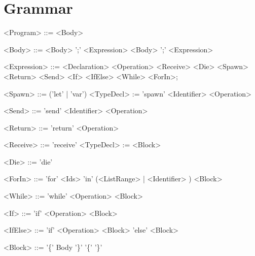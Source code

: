 \section{Grammar}
\setlength{\grammarindent}{100pt}
\begin{grammar}
<Program> ::= <Body>

<Body> ::= <Body> ';' <Expression>
 \alt <Body> ';'
 \alt <Expression>

<Expression> ::= <Declaration>
 \alt <Operation>
 \alt <Receive>
 \alt <Die>
 \alt <Spawn>
 \alt <Return>
 \alt <Send>
 \alt <If>
 \alt <IfElse>
 \alt <While>
 \alt <ForIn>;

<Spawn> ::= ('let' | 'var') <TypeDecl> := 'spawn' <Identifier> <Operation>

<Send> ::= 'send' <Identifier> <Operation>

<Return> ::= 'return' <Operation>

<Receive> ::= 'receive' <TypeDecl> := <Block>

<Die> ::= 'die'

<ForIn> ::= 'for' <Ids> 'in' (<ListRange> | <Identifier> ) <Block>

<While> ::= 'while' <Operation> <Block>

<If> ::= 'if' <Operation> <Block>

<IfElse> ::= 'if' <Operation> <Block> 'else' <Block>

<Block> ::= '\{' Body '\}'
 \alt '\{' '\}'
\end{grammar}
